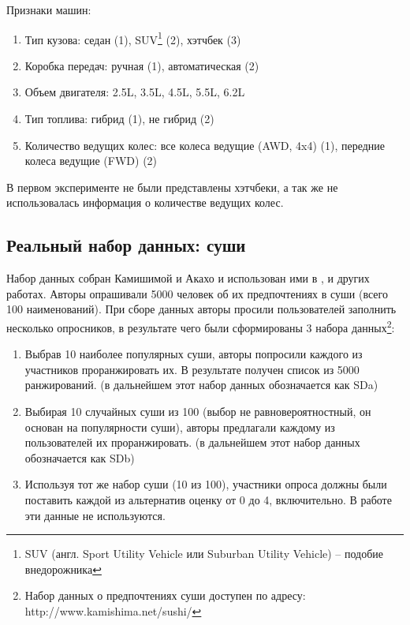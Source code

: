 		\vspace{1em}
		
		\noindent Признаки машин:
		\vspace{-0.7em}
		\begin{enumerate}[itemsep=-1.5mm]
			\item Тип кузова: седан (1), SUV\footnote{SUV (англ. Sport Utility Vehicle или Suburban Utility Vehicle) – подобие внедорожника} (2), хэтчбек (3)
			\item Коробка передач: ручная (1), автоматическая (2)
			\item Объем двигателя: 2.5L, 3.5L, 4.5L, 5.5L, 6.2L
			\item Тип топлива: гибрид (1), не гибрид (2)
			\item Количество ведущих колес: все колеса ведущие (AWD, 4x4) (1), передние колеса ведущие (FWD) (2)
		\end{enumerate} 
		В первом эксперименте не были представлены хэтчбеки, а так же не использовалась информация о количестве ведущих колес.
	
	\subsection{Реальный набор данных: суши}
		Набор данных собран Камишимой и Акахо и использован ими в \cite{Kamishima:2003}, \cite{Kamishima:2006} и других работах. Авторы опрашивали 5000 человек об их предпочтениях в суши (всего 100 наименований). При сборе данных авторы просили пользователей заполнить несколько опросников, в результате чего были сформированы 3 набора данных\footnote{Набор данных о предпочтениях суши доступен по адресу: http://www.kamishima.net/sushi/}:
		\begin{enumerate}[itemsep=-1.5mm]
			\item Выбрав 10 наиболее популярных суши, авторы попросили каждого из участников проранжировать их. В результате получен список из 5000 ранжирований. (в дальнейшем этот набор данных обозначается как SDa)
			\item Выбирая 10 случайных суши из 100 (выбор не равновероятностный, он основан на популярности суши), авторы предлагали каждому из пользователей их проранжировать. (в дальнейшем этот набор данных обозначается как SDb)
			\item Используя тот же набор суши (10 из 100), участники опроса должны были поставить каждой из альтернатив оценку от 0 до 4, включительно. В работе эти данные не используются.
		\end{enumerate}
		
